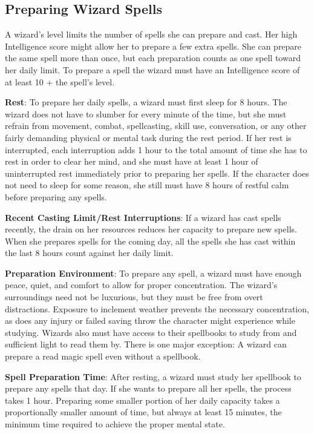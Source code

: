 \subsection{Preparing Wizard Spells}
A wizard's level limits the number of spells she can prepare and cast. Her high Intelligence score might allow her to prepare a few extra spells. She can prepare the same spell more than once, but each preparation counts as one spell toward her daily limit. To prepare a spell the wizard must have an Intelligence score of at least 10 + the spell's level.

\textbf{Rest}: To prepare her daily spells, a wizard must first sleep for 8 hours. The wizard does not have to slumber for every minute of the time, but she must refrain from movement, combat, spellcasting, skill use, conversation, or any other fairly demanding physical or mental task during the rest period. If her rest is interrupted, each interruption adds 1 hour to the total amount of time she has to rest in order to clear her mind, and she must have at least 1 hour of uninterrupted rest immediately prior to preparing her spells. If the character does not need to sleep for some reason, she still must have 8 hours of restful calm before preparing any spells.

\textbf{Recent Casting Limit/Rest Interruptions}: If a wizard has cast spells recently, the drain on her resources reduces her capacity to prepare new spells. When she prepares spells for the coming day, all the spells she has cast within the last 8 hours count against her daily limit.

\textbf{Preparation Environment}: To prepare any spell, a wizard must have enough peace, quiet, and comfort to allow for proper concentration. The wizard's surroundings need not be luxurious, but they must be free from overt distractions. Exposure to inclement weather prevents the necessary concentration, as does any injury or failed saving throw the character might experience while studying. Wizards also must have access to their spellbooks to study from and sufficient light to read them by. There is one major exception: A wizard can prepare a read magic spell even without a spellbook.

\textbf{Spell Preparation Time}: After resting, a wizard must study her spellbook to prepare any spells that day. If she wants to prepare all her spells, the process takes 1 hour. Preparing some smaller portion of her daily capacity takes a proportionally smaller amount of time, but always at least 15 minutes, the minimum time required to achieve the proper mental state.

